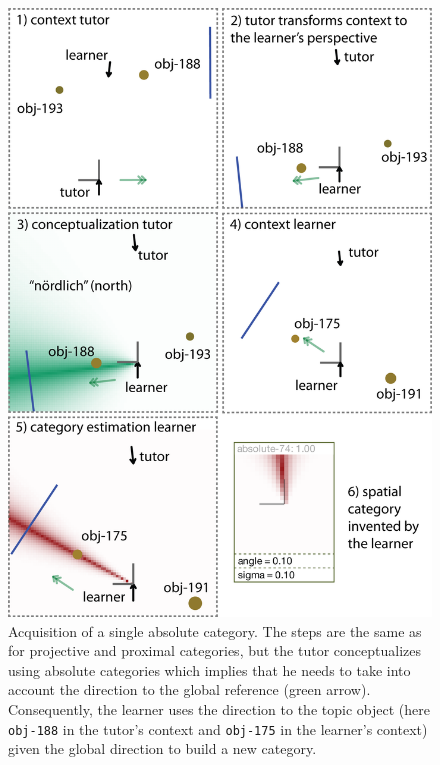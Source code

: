 \begin{figure}
\begin{center}
\includegraphics[width=0.8\columnwidth]{figs/category-acquisition-absolute-single-category-acquisition.png}
\end{center}
\caption[Acquisition of a single absolute category]{%
Acquisition of a single absolute category. The steps are the 
same as for projective and proximal categories, but the tutor 
conceptualizes using absolute categories which
implies that he needs to take into account the direction to 
the global reference (green arrow).
Consequently, the learner uses the direction to the topic object 
(here {\footnotesize\tt obj-188} in the tutor's context and {\footnotesize\tt obj-175} in the learner's context)
given the global direction to build a new category.}
\label{f:category-acquisition-absolute-single-acquisition}
\end{figure}



